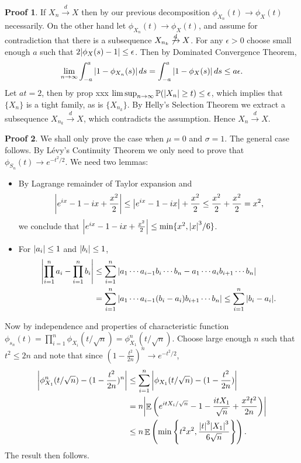\documentclass[hidelinks,11pt]{article}
\theoremstyle{definition}
\theoremstyle{dotless}
\newtheorem{prop}{Proof}[section]
\theoremstyle{remark}
\DeclareMathOperator{\E}{\mathbb{E}}
\DeclareMathOperator{\1}{\mathbf{1}}
\DeclareMathOperator{\0}{\mathbf{0}}
\begin{document}
\begin{prop}
If $X_n\xrightarrow{d}X$ then by our previous decomposition $\phi_{X_n}(t)\to\phi_X(t)$ necessarily.\medbreak
On the other hand let $\phi_{X_n}(t)\to\phi_X(t)$, and assume for contradiction that there is a subsequence $X_{n_k}\not\xrightarrow{d}X$. For any $\epsilon>0$ choose small enough $a$ such that $2\abs{\phi_X(s)-1}\leq\epsilon$. Then by Dominated Convergence Theorem,
\[\lim_{n\to\infty}\int_{-a}^a\abs{1-\phi_{X_n}(s)}\,ds=\int_{-a}^a\abs{1-\phi_X(s)}\,ds\leq a\epsilon.\]
Let $at=2$, then by prop xxx $\limsup_{n\to\infty}\mathbb{P}(\abs{X_n}\geq t)\leq\epsilon$, which implies that $\{X_n\}$ is a tight family, as is $\{X_{n_k}\}$. By Helly's Selection Theorem we extract a subsequence $X_{n_k}\xrightarrow{d}X$, which contradicts the assumption. Hence $X_n\xrightarrow{d}X$.
\end{prop}

\begin{prop}
We shall only prove the case when $\mu=0$ and $\sigma=1$. The general case follows. By Lévy's Continuity Theorem we only need to prove that $\phi_{S_n}(t)\to e^{-t^2/2}$. We need two lemmas:\begin{itemize}
    \item By Lagrange remainder of Taylor expansion and
    \[\abs{e^{ix}-1-ix+\frac{x^2}{2}}\leq\abs{e^{ix}-1-ix}+\frac{x^2}{2}\leq\frac{x^2}{2}+\frac{x^2}{2}=x^2,\]
    we conclude that $\abs{e^{ix}-1-ix+\frac{x^2}{2}}\leq\min\{x^2,\abs{x}^3/6\}$.
    \item For $\abs{a_i}\leq1$ and $\abs{b_i}\leq1$,
    \begin{align*}
    \abs{\prod_{i=1}^na_i-\prod_{i=1}^nb_i}&\leq\sum_{i=1}^n\abs{a_1\cdots a_{i-1}b_i\cdots b_n-a_1\cdots a_ib_{i+1}\cdots b_n}\\
    &=\sum_{i=1}^n\abs{a_1\cdots a_{i-1}(b_i-a_i)b_{i+1}\cdots b_n}\leq\sum_{i=1}^n\abs{b_i-a_i}.
    \end{align*}
\end{itemize}
Now by independence and properties of characteristic function $\phi_{s_n}(t)=\prod_{i=1}^n\phi_{X_i}(t/\sqrt{n})=\phi_{X_1}^n(t/\sqrt{n})$. Choose large enough $n$ such that $t^2\leq2n$ and note that since $(1-\frac{t^2}{2n})^n\to e^{-t^2/2}$,
\begin{align*}
    \abs{\phi_{X_1}^n(t/\sqrt{n})-(1-\frac{t^2}{2n})^n}&\leq\sum_{i=1}^n\abs{\phi_{X_1}(t/\sqrt{n})-(1-\frac{t^2}{2n})}\\
    &=n\abs{\E\left(e^{itX_i/\sqrt{n}}-1-\frac{itX_1}{\sqrt{n}}+\frac{x^2t^2}{2n}\right)}\\
    &\leq n\E\left(\min\left\{t^2x^2,\frac{\abs{t}^3\abs{X_1}^3}{6\sqrt{n}}\right\}\right).
\end{align*}
The result then follows.
\end{prop}
\end{document}
